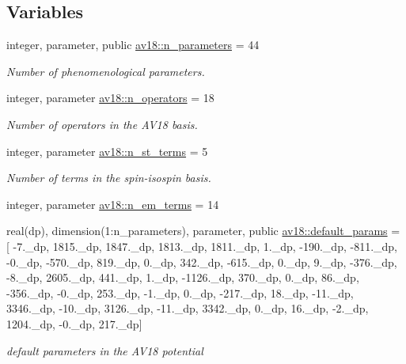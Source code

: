 \subsection*{Variables}
\begin{DoxyCompactItemize}
\item 
integer, parameter, public \hyperlink{namespaceav18_a227e50c056ed5f33a1de8f7536c2393b}{av18\+::n\+\_\+parameters} = 44
\begin{DoxyCompactList}\small\item\em Number of phenomenological parameters. \end{DoxyCompactList}\item 
integer, parameter \hyperlink{namespaceav18_a360396af16932b4172038bd146cb1e0a}{av18\+::n\+\_\+operators} = 18
\begin{DoxyCompactList}\small\item\em Number of operators in the A\+V18 basis. \end{DoxyCompactList}\item 
integer, parameter \hyperlink{namespaceav18_ae95361ff4578323939542bc0807d127d}{av18\+::n\+\_\+st\+\_\+terms} = 5
\begin{DoxyCompactList}\small\item\em Number of terms in the spin-\/isospin basis. \end{DoxyCompactList}\item 
integer, parameter \hyperlink{namespaceav18_abdf1bd7208851f82a6773c558de0602f}{av18\+::n\+\_\+em\+\_\+terms} = 14
\item 
real(dp), dimension(1\+:n\+\_\+parameters), parameter, public \hyperlink{namespaceav18_a8a031093cf20f6305f0a0b8f557c1deb}{av18\+::default\+\_\+params} = \mbox{[} -\/7.\+\_\+dp, 1815.\+\_\+dp, 1847.\+\_\+dp, 1813.\+\_\+dp, 1811.\+\_\+dp, 1.\+\_\+dp, -\/190.\+\_\+dp, -\/811.\+\_\+dp, -\/0.\+\_\+dp, -\/570.\+\_\+dp, 819.\+\_\+dp, 0.\+\_\+dp, 342.\+\_\+dp, -\/615.\+\_\+dp, 0.\+\_\+dp, 9.\+\_\+dp, -\/376.\+\_\+dp, -\/8.\+\_\+dp, 2605.\+\_\+dp, 441.\+\_\+dp, 1.\+\_\+dp, -\/1126.\+\_\+dp, 370.\+\_\+dp, 0.\+\_\+dp, 86.\+\_\+dp, -\/356.\+\_\+dp, -\/0.\+\_\+dp, 253.\+\_\+dp, -\/1.\+\_\+dp, 0.\+\_\+dp, -\/217.\+\_\+dp, 18.\+\_\+dp, -\/11.\+\_\+dp, 3346.\+\_\+dp, -\/10.\+\_\+dp, 3126.\+\_\+dp, -\/11.\+\_\+dp, 3342.\+\_\+dp, 0.\+\_\+dp, 16.\+\_\+dp, -\/2.\+\_\+dp, 1204.\+\_\+dp, -\/0.\+\_\+dp, 217.\+\_\+dp\mbox{]}
\begin{DoxyCompactList}\small\item\em default parameters in the A\+V18 potential \end{DoxyCompactList}\end{DoxyCompactItemize}
